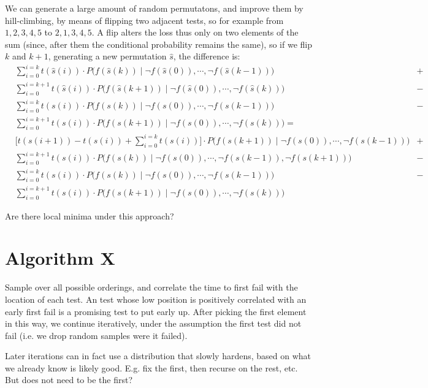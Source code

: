 \documentclass[12pt]{article}
\begin{document}
We can generate a large amount of random permutatons, and improve them by hill-climbing, by means of flipping two adjacent tests, so for example from $1,2,3,4,5$ to $2,1,3,4,5$. A flip alters the loss thus only on two elements of the sum (since, after them the conditional probability remains the same), so if we flip $k$ and $k+1$, generating a new permutation $\hat{s}$, the difference is:
\begin{align}
  &\sum_{i=0}^{i=k} t(\hat{s}(i)) \cdot P\Big(f(\hat{s}(k)) \; \Big| \; \neg f(\hat{s}(0)), \cdots, \neg f(\hat{s}(k-1)) \Big) &+ \\
  &\sum_{i=0}^{i=k+1} t(\hat{s}(i)) \cdot P\Big(f(\hat{s}(k+1)) \; \Big| \; \neg f(\hat{s}(0)), \cdots, \neg f(\hat{s}(k)) \Big) &- \\
  &\sum_{i=0}^{i=k} t(s(i)) \cdot P\Big(f(s(k)) \; \Big| \; \neg f(s(0)), \cdots, \neg f(s(k-1)) \Big) &- \\
  &\sum_{i=0}^{i=k+1} t(s(i)) \cdot P\Big(f(s(k+1)) \; \Big| \; \neg f(s(0)), \cdots, \neg f(s(k)) \Big) = \\
  &\Big[ t(s(i+1)) - t(s(i)) + \sum_{i=0}^{i=k} t(s(i)) \Big] \cdot P\Big(f(s(k+1)) \; \Big| \; \neg f(s(0)), \cdots, \neg f(s(k-1)) \Big) &+ \\
  &\sum_{i=0}^{i=k+1} t(s(i)) \cdot P\Big(f(s(k)) \; \Big| \; \neg f(s(0)), \cdots, \neg f(s(k-1)), \neg f(s(k+1)) \Big) &- \\
  &\sum_{i=0}^{i=k} t(s(i)) \cdot P\Big(f(s(k)) \; \Big| \; \neg f(s(0)), \cdots, \neg f(s(k-1)) \Big) &- \\
  &\sum_{i=0}^{i=k+1} t(s(i)) \cdot P\Big(f(s(k+1)) \; \Big| \; \neg f(s(0)), \cdots, \neg f(s(k)) \Big)
\end{align}

Are there local minima under this approach?

\section{Algorithm X}

Sample over all possible orderings, and correlate the time to first fail with the location of each test. An test whose low position is positively correlated with an early first fail is a promising test to put early up. After picking the first element in this way, we continue iteratively, under the assumption the first test did not fail (i.e. we drop random samples were it failed).

Later iterations can in fact use a distribution that slowly hardens, based on what we already know is likely good. E.g. fix the first, then recurse on the rest, etc. But does not need to be the first?
\end{document}
